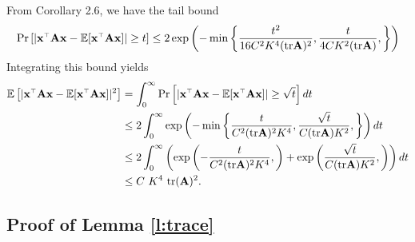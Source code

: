 \documentclass[11pt]{article}
\begin{document}
  From \cite{zajkowski2018bounds} Corollary 2.6, we have the tail bound
  \begin{align*}
    \Pr\left[
      \lvert \x^\top \A \x - \E[\x^\top \A \x] \rvert
      \geq t
      \right] \leq 2 \exp\left(
      -\min\left\{
        \frac{t^2}{16 C^2  K^4 (\tr \A)^2},
        \frac{t}{4 C K^2 (\tr \A)},
      \right\}
    \right)
  \end{align*}
  Integrating this bound yields
  \begin{align*}
      \E\left[ \lvert \x^\top \A \x - \E[\x^\top \A \x] \rvert^2 \right]
      &= \int_0^\infty \Pr\left[
        \lvert \x^\top \A \x - \E[\x^\top \A \x] \rvert
        \geq \sqrt{t}
      \right]dt \\
      &\leq 2 \int_0^\infty \exp\left(
        -\min\left\{
          \frac{t}{C^2  (\tr \A)^2 K^4},
          \frac{\sqrt{t}}{C  (\tr \A) K^2},
        \right\}
      \right)dt \\
      &\leq 2 \int_0^\infty \left(\exp\left(
        - \frac{t}{C^2  (\tr \A)^2 K^4},
        \right) + \exp\left(
        \frac{\sqrt{t}}{C  (\tr \A) K^2},
      \right)\right)dt \\
      &\leq C~K^4~\tr(\A)^2.
  \end{align*}

\subsection{Proof of Lemma \ref{l:trace}}
\end{document}
